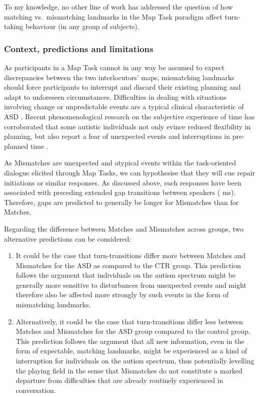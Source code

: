 To my knowledge, no other line of work has addressed the question of how matching vs.~mismatching landmarks in the Map Task paradigm affect turn-taking behaviour (in any group of subjects).

\subsubsection{Context, predictions and limitations}\label{turntaking_results_mismatches_background}


As participants in a Map Task cannot in any way be assumed to expect discrepancies between the two interlocutors' maps, mismatching landmarks should force participants to interrupt and discard their existing planning and adapt to unforeseen circumstances. Difficulties in dealing with situations involving change or unpredictable events are a typical clinical characteristic of ASD \citep[p. 50, Criterion B2]{americanpsychiatricassociationDiagnosticStatisticalManual2013}. Recent phenomenological research on the subjective experience of time has corroborated that some autistic individuals not only evince reduced flexibility in planning, but also report a fear of unexpected events and interruptions in pre-planned time \citep{vogelInterruptedTimeExperience2019}.

As Mismatches are unexpected and atypical events within the task-oriented dialogue elicited through Map Tasks, we can hypothesise that they will cue repair initiations or similar responses. As discussed above, such responses have been associated with preceding extended gap transitions between speakers ( ms). Therefore, gaps are predicted to generally be longer for Mismatches than for Matches.

Regarding the difference between Matches and Mismatches across groups, two alternative predictions can be considered:

\begin{enumerate}
\def\labelenumi{\arabic{enumi})}
\item
It could be the case that turn-transitions differ more between Matches and Mismatches for the ASD as compared to the CTR group. This prediction follows the argument that individuals on the autism spectrum might be generally more sensitive to disturbances from unexpected events and might therefore also be affected more strongly by such events in the form of mismatching landmarks.
\item
Alternatively, it could be the case that turn-transitions differ less between Matches and Mismatches for the ASD group compared to the control group. This prediction follows the argument that all new information, even in the form of expectable, matching landmarks, might be experienced as a kind of interruption for individuals on the autism spectrum, thus potentially levelling the playing field in the sense that Mismatches do not constitute a marked departure from difficulties that are already routinely experienced in conversation.
\end{enumerate}

